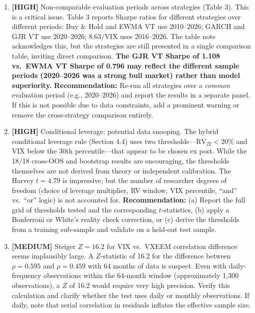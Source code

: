 \documentclass[12pt,a4paper]{article}
\newcommand{\HIGH}[1]{\textcolor{errorred}{\textbf{[HIGH]} #1}}
\newcommand{\MEDIUM}[1]{\textcolor{warncolor}{\textbf{[MEDIUM]} #1}}
\begin{document}
\begin{enumerate}[leftmargin=2em]

\item \HIGH{Non-comparable evaluation periods across strategies (Table 3).} This is a critical issue. Table 3 reports Sharpe ratios for different strategies over different periods: Buy \& Hold and EWMA VT use 2010--2026; GARCH and GJR VT use 2020--2026; $8.63/\text{VIX}$ uses 2016--2026. The table note acknowledges this, but the strategies are still presented in a single comparison table, inviting direct comparison. \textbf{The GJR VT Sharpe of 1.108 vs.\ EWMA VT Sharpe of 0.796 may reflect the different sample periods (2020--2026 was a strong bull market) rather than model superiority.} \textbf{Recommendation:} Re-run all strategies over a \textit{common} evaluation period (e.g., 2020--2026) and report the results in a separate panel. If this is not possible due to data constraints, add a prominent warning or remove the cross-strategy comparison entirely.

\item \HIGH{Conditional leverage: potential data snooping.} The hybrid conditional leverage rule (Section 4.4) uses two thresholds---$\text{RV}_{22} < 20\%$ and VIX below the 30th percentile---that appear to be chosen ex post. While the 18/18 cross-OOS and bootstrap results are encouraging, the thresholds themselves are not derived from theory or independent calibration. The Harvey $t = 4.79$ is impressive, but the number of researcher degrees of freedom (choice of leverage multiplier, RV window, VIX percentile, ``and'' vs.\ ``or'' logic) is not accounted for. \textbf{Recommendation:} (a) Report the full grid of thresholds tested and the corresponding $t$-statistics, (b) apply a Bonferroni or White's reality check correction, or (c) derive the thresholds from a training sub-sample and validate on a held-out test sample.

\item \MEDIUM{Steiger $Z = 16.2$ for VIX vs.\ VXEEM correlation difference seems implausibly large.} A $Z$-statistic of 16.2 for the difference between $\rho = 0.595$ and $\rho = 0.459$ with 64 months of data is suspect. Even with daily-frequency observations within the 64-month window (approximately 1,300 observations), a $Z$ of 16.2 would require very high precision. Verify this calculation and clarify whether the test uses daily or monthly observations. If daily, note that serial correlation in residuals inflates the effective sample size.


\end{enumerate}
\end{document}
